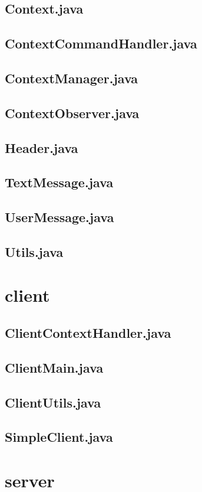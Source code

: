 \documentclass[a4paper, 12pt]{report}
\begin{document}
    \section{Context.java}
    \section{ContextCommandHandler.java}
    \section{ContextManager.java}
    \section{ContextObserver.java}
    \section{Header.java}
    \section{TextMessage.java}
    \section{UserMessage.java}
    \section{Utils.java}

    \chapter{client}
    \section{ClientContextHandler.java}
    \section{ClientMain.java}
    \section{ClientUtils.java}
    \section{SimpleClient.java}

    \chapter{server}
\end{document}
